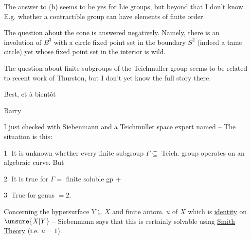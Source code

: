 The answer to (b) seems to be yes for Lie groups, but beyond that I don't know. E.g. whether a contractible group  can have elements of finite order.

The question about the cone is answered negatively. Namely, there is an involution of $B^3$ with a circle fixed point set in the boundary $S^2$ (indeed a tame circle) yet whose fixed point set in the interior is wild. 

The question about finite subgroups of the Teichmuller group seems to be related to recent work of Thurston, but I don't yet know the full story there.


Best, et à bientôt

Barry



I just checked with Siebenmann and a Teichmuller space expert named  -- The situation is this:

\textcircled{1} It is unknown whether every finite subgroup $\Gamma\subseteq$ Teich. group operates on an algebraic curve. But

\textcircled{2} It is true for $\Gamma=$ finite soluble gp +

\textcircled{3} True  for genus $=2$.


Concerning the hypersurface $Y\subseteq X$ and finite autom. $u$ of $X$ which is \uline{identity} on $\unsure{X|Y}$ -- Siebenmann says that this is certainly solvable using \uline{Smith Theory} (i.e. $u=1$).


